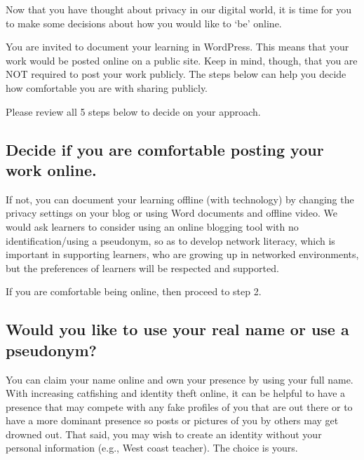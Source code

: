 \documentclass[
]{book}
\begin{document}
Now that you have thought about privacy in our digital world, it is time for you to make some decisions about how you would like to `be' online.

You are invited to document your learning in WordPress. This means that your work would be posted online on a public site. Keep in mind, though, that you are NOT required to post your work publicly. The steps below can help you decide how comfortable you are with sharing publicly.

Please review all 5 steps below to decide on your approach.

\hypertarget{decide-if-you-are-comfortable-posting-your-work-online.}{%
\subsection*{Decide if you are comfortable posting your work online.}\label{decide-if-you-are-comfortable-posting-your-work-online.}}

If not, you can document your learning offline (with technology) by changing the privacy settings on your blog or using Word documents and offline video. We would ask learners to consider using an online blogging tool with no identification/using a pseudonym, so as to develop network literacy, which is important in supporting learners, who are growing up in networked environments, but the preferences of learners will be respected and supported.

If you are comfortable being online, then proceed to step 2.

\hypertarget{would-you-like-to-use-your-real-name-or-use-a-pseudonym}{%
\subsection*{Would you like to use your real name or use a pseudonym?}\label{would-you-like-to-use-your-real-name-or-use-a-pseudonym}}

You can claim your name online and own your presence by using your full name. With increasing catfishing and identity theft online, it can be helpful to have a presence that may compete with any fake profiles of you that are out there or to have a more dominant presence so posts or pictures of you by others may get drowned out. That said, you may wish to create an identity without your personal information (e.g., West coast teacher). The choice is yours.
\end{document}
